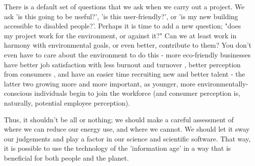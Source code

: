 \documentclass{article}
\begin{document}
There is a default set of questions that we ask when we carry out a project. We ask 'is this going to be useful?', 'is this user-friendly?', or 'is my new building accessible to disabled people?'. Perhaps it is time to add a new question; "does my project work for the environment, or against it?" Can we at least work in harmony with environmental goals, or even better, contribute to them? You don't even have to care about the environment to do this - more eco-friendly businesses have better job satisfaction with less burnout and turnover \citep{yu2020hotels} \citep{reverte2016influence}, better perception from consumers \citep{miles1993eco}, and have an easier time recruiting new and better talent \citep{aranganathan2018green} - the latter two growing more and more important, as younger, more environmentally-conscious individuals begin to join the workforce (and consumer perception is, naturally, potential employee perception).\newline

Thus, it shouldn't be all or nothing; we should make a careful assessment of where we can reduce our energy use, and where we cannot. We should let it sway our judgements and play a factor in our science and scientific software. That way, it is possible to use the technology of the 'information age' in a way that is beneficial for both people and the planet.



\end{document}
